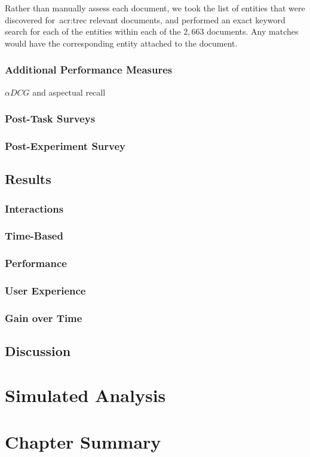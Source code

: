 Rather than manually assess each document, we took the list of entities that were discovered for~\gls{acr:trec} relevant documents, and performed an exact keyword search for each of the entities within each of the $2,663$ documents. Any matches would have the corresponding entity attached to the document.

\subsubsection{Additional Performance Measures}\label{sec:diversity:users:measures}
$\alpha DCG$ and aspectual recall

\subsubsection{Post-Task Surveys}

\subsubsection{Post-Experiment Survey}

\subsection{Results}

\subsubsection{Interactions}

\subsubsection{Time-Based}

\subsubsection{Performance}

\subsubsection{User Experience}

\subsubsection{Gain over Time}

\subsection{Discussion}

\section{Simulated Analysis}\label{sec:diversity:simulated}

\section{Chapter Summary}